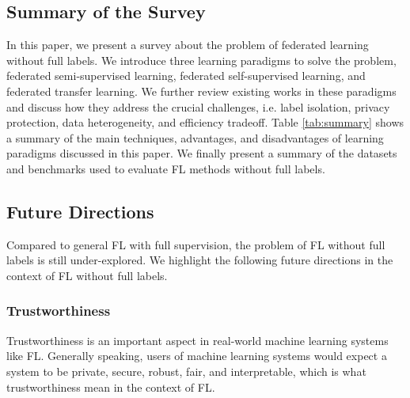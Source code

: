 \documentclass[11pt]{article}
\begin{document}
\subsection{Summary of the Survey}
In this paper, we present a survey about the problem of federated learning without full labels. We introduce three learning paradigms to solve the problem, federated semi-supervised learning, federated self-supervised learning, and federated transfer learning. We further review existing works in these paradigms and discuss how they address the crucial challenges, i.e. label isolation, privacy protection, data heterogeneity, and efficiency tradeoff. Table \ref{tab:summary} shows a summary of the main techniques, advantages, and disadvantages of learning paradigms discussed in this paper. We finally present a summary of the datasets and benchmarks used to evaluate FL methods without full labels.

\subsection{Future Directions}
Compared to general FL with full supervision, the problem of FL without full labels is still under-explored. We highlight the following future directions in the context of FL without full labels.

\subsubsection{Trustworthiness}
Trustworthiness is an important aspect in real-world machine learning systems like FL. Generally speaking, users of machine learning systems would expect a system to be private, secure, robust, fair, and interpretable, which is what trustworthiness mean in the context of FL.
\end{document}
